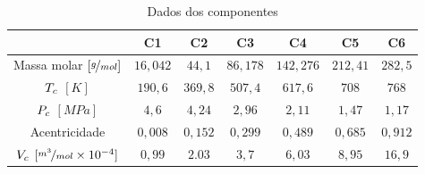 \documentclass[professionalfont]{beamer}
\begin{document}
\begin{frame}{\FrameProblemName}
    \begin{table}
        \small
        \centering
        \begin{subtable}{\textwidth}
            \centering
            \begin{tabular}{|c|c|c|c|c|c|c|}
                \hline
                 & C1 & C2 & C3 & C4 & C5 & C6 \\
                \hline
                Massa molar $[\nicefrac{g}{mol}]$ & $16,042 $ & $44,1$ & $86,178$ & $142,276$ & $212,41$ & $282,5$\\
                \hline
                $T_{c}$ $[K]$ & $190,6 $ & $369,8$ & $507,4$ & $617,6$ & $708$ & $768$\\
                \hline
                $P_{c}$ $[MPa]$ & $4,6$ & $4,24$ & $2,96$ & $2,11$ & $1,47$ & $1,17$\\
                \hline
                Acentricidade & $0,008$ & $0,152$ & $0,299$ & $0,489$ & $0,685$ & $0,912$\\
                \hline
                $V_{c}$ $[\nicefrac{m^{3}}{mol} \times 10^{-4}]$ & $0,99 $ & $2.03$ & $3,7$ & $6,03$ & $8,95$ & $16,9$\\
                \hline            
            \end{tabular}
            \caption{Dados dos componentes}
            \label{tab:table_prob3.c}
        \end{subtable}
    \end{table}
    
\end{frame}
\end{document}

